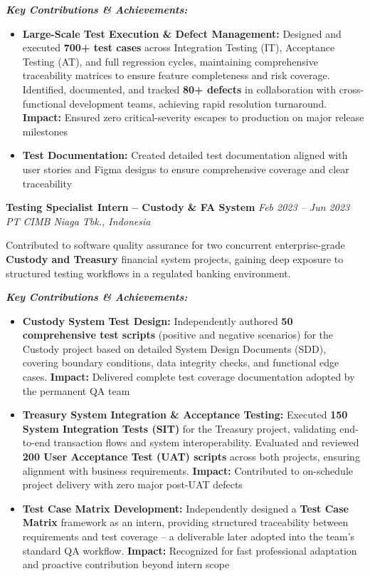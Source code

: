 \documentclass[10pt,a4paper]{article}
\newcommand{\experience}[4]{%
    \noindent\textbf{#1} \hfill \textit{#2}\\
    \textit{#3} \hfill #4\vspace{2pt}
}
\begin{document}
\textit{\textbf{Key Contributions \& Achievements:}}
\begin{itemize}
    \item \textbf{Large-Scale Test Execution \& Defect Management:} Designed and executed \textbf{700+ test cases} across Integration Testing (IT), Acceptance Testing (AT), and full regression cycles, maintaining comprehensive traceability matrices to ensure feature completeness and risk coverage. Identified, documented, and tracked \textbf{80+ defects} in collaboration with cross-functional development teams, achieving rapid resolution turnaround. \textcolor{accent}{\textbf{Impact:}} Ensured zero critical-severity escapes to production on major release milestones
    \item \textbf{Test Documentation:} Created detailed test documentation aligned with user stories and Figma designs to ensure comprehensive coverage and clear traceability
\end{itemize}

\vspace{4pt}

\experience{Testing Specialist Intern -- Custody \& FA System}{Feb 2023 -- Jun 2023}{PT CIMB Niaga Tbk., Indonesia}{}

Contributed to software quality assurance for two concurrent enterprise-grade \textbf{Custody and Treasury} financial system projects, gaining deep exposure to structured testing workflows in a regulated banking environment.

\textit{\textbf{Key Contributions \& Achievements:}}
\begin{itemize}
    \item \textbf{Custody System Test Design:} Independently authored \textbf{50 comprehensive test scripts} (positive and negative scenarios) for the Custody project based on detailed System Design Documents (SDD), covering boundary conditions, data integrity checks, and functional edge cases. \textcolor{accent}{\textbf{Impact:}} Delivered complete test coverage documentation adopted by the permanent QA team
    \item \textbf{Treasury System Integration \& Acceptance Testing:} Executed \textbf{150 System Integration Tests (SIT)} for the Treasury project, validating end-to-end transaction flows and system interoperability. Evaluated and reviewed \textbf{200 User Acceptance Test (UAT) scripts} across both projects, ensuring alignment with business requirements. \textcolor{accent}{\textbf{Impact:}} Contributed to on-schedule project delivery with zero major post-UAT defects
    \item \textbf{Test Case Matrix Development:} Independently designed a \textbf{Test Case Matrix} framework as an intern, providing structured traceability between requirements and test coverage -- a deliverable later adopted into the team's standard QA workflow. \textcolor{accent}{\textbf{Impact:}} Recognized for fast professional adaptation and proactive contribution beyond intern scope
\end{itemize}
\end{document}
